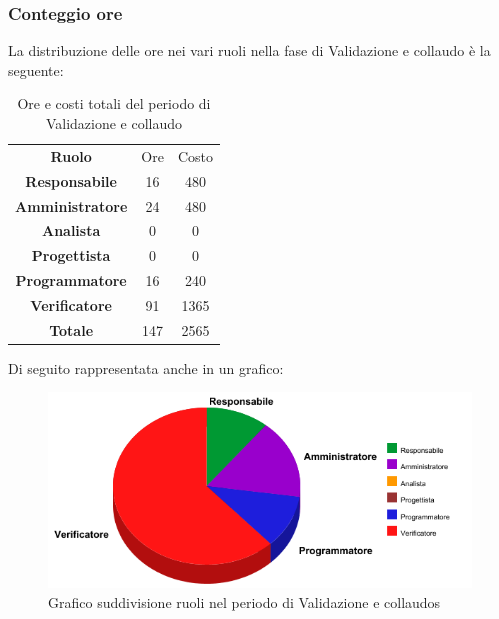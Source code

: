 	\subsubsection{Conteggio ore}
	La distribuzione delle ore nei vari ruoli nella fase di Validazione e collaudo è la seguente:
	
	\begin{table}[!htpb]
		\centering
		\renewcommand{\arraystretch}{2} 
		\begin{tabular}{| c c c|}
			\rowcolor{orange!50}
			\hline
			\multicolumn{3}{|c|}{\textbf{Suddivisione ruoli in ore}}\\
			\hline
			\textbf{Ruolo} 			& Ore 	& Costo\\
			\hline
			\textbf{Responsabile}	&16		&480\\
			\hline
			\textbf{Amministratore}	&24		&480\\
			\hline
			\textbf{Analista}		&0		&0\\
			\hline
			\textbf{Progettista}	&0		&0\\
			\hline
			\textbf{Programmatore}	&16		&240\\
			\hline
			\textbf{Verificatore} 	&91		&1365\\
			\hline
			\textbf{Totale} 		&147	&2565\\
			\hline 
		\end{tabular}
		\caption{Ore e costi totali del periodo di Validazione e collaudo}
	\end{table}
	Di seguito rappresentata anche in un grafico:
\begin{figure}[!htpb]
	\centering
	\includegraphics[scale=0.8]{preventivo/torta_quarta_parte.png}
	\caption{Grafico suddivisione ruoli nel periodo di Validazione e collaudos}
\end{figure}
\clearpage
